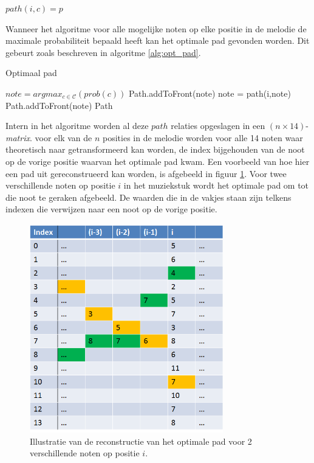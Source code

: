 \begin{framed}
\noindent
$path(i,c)=p$
\end{framed}

Wanneer het algoritme voor alle mogelijke noten op elke positie in de melodie de maximale probabiliteit bepaald heeft kan het optimale pad gevonden worden. Dit gebeurt zoals beschreven in algoritme \ref{alg:opt_pad}.

\begin{algorithm}
\caption{Optimaal pad}\label{alg:opt_pad}
\begin{algorithmic}
\State $note=argmax_{c \in \mathcal{C}}(prob(c))$
\State Path.addToFront(note)
	\State note = path(i,note)
	\State Path.addToFront(note)
\EndFor
\State \Return Path
\end{algorithmic}
\end{algorithm}

Intern in het algoritme worden al deze $path$ relaties opgeslagen in een $(n\times 14)$-\textit{matrix}. voor elk van de $n$ posities in de melodie worden voor alle 14 noten waar theoretisch naar getransformeerd kan worden, de index bijgehouden van de noot op de vorige positie waarvan het optimale pad kwam. Een voorbeeld van hoe hier een pad uit gereconstrueerd kan worden, is afgebeeld in figuur \ref{figuur:matrix}. Voor twee verschillende noten op positie $i$ in het muziekstuk wordt het optimale pad om tot die noot te geraken afgebeeld. De waarden die in de vakjes staan zijn telkens indexen die verwijzen naar een noot op de vorige positie.

\begin{figure}[!ht]
  \centering
  \includegraphics[width=0.75\textwidth]{4_Efficient_Toepassen_Transformatie/matrix}
  \caption{Illustratie van de reconstructie van het optimale pad voor 2 verschillende noten op positie $i$.}
  \label{figuur:matrix}
\end{figure}


